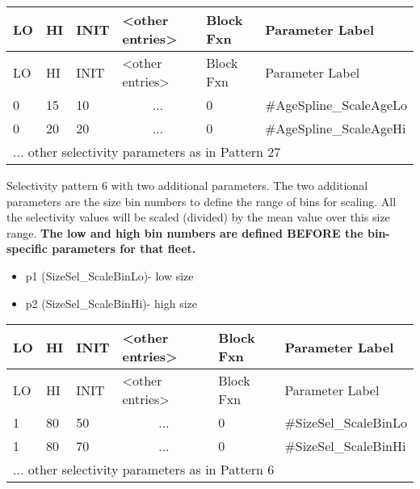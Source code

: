 	\begin{longtable}{p{1cm} p{1cm} p{1cm} p{2.9cm} p{1.9cm} p{4.2cm}}
		\hline
		LO \Tstrut & HI & INIT & <other entries> & Block Fxn & Parameter Label \Bstrut\\
		\hline
		\endfirsthead
	
		\hline
		LO \Tstrut & HI & INIT & <other entries> & Block Fxn & Parameter Label \Bstrut\\
		\hline
		\endhead

		0 & 15 & 10 & \multicolumn{1}{c}{...} & 0 & \#AgeSpline\_ScaleAgeLo \Tstrut\\
		0 & 20 & 20 & \multicolumn{1}{c}{...} & 0 & \#AgeSpline\_ScaleAgeHi \Tstrut\\
		\multicolumn{6}{l}{... other selectivity parameters as in Pattern 27} \Bstrut\\
		\hline
	\end{longtable}

\hypertarget{NonParamScaling}{}
Selectivity pattern 6 with two additional parameters. The two additional parameters are the size bin numbers to define the range of bins for scaling. All the selectivity values will be scaled (divided) by the mean value over this size range. \textbf{The low and high bin numbers are defined BEFORE the bin-specific parameters for that fleet.}
	\begin{itemize}
		\item p1 (SizeSel\_ScaleBinLo)- low size
		\item p2 (SizeSel\_ScaleBinHi)- high size
	\end{itemize}

	\begin{longtable}{p{1cm} p{1cm} p{1cm} p{2.9cm} p{1.9cm} p{4.2cm}}
		\hline
		LO \Tstrut & HI & INIT & <other entries> & Block Fxn & Parameter Label \Bstrut\\
		\hline
		\endfirsthead
	
		\hline
		LO \Tstrut & HI & INIT & <other entries> & Block Fxn & Parameter Label \Bstrut\\
		\hline
		\endhead

		1 & 80 & 50 & \multicolumn{1}{c}{...} & 0 & \#SizeSel\_ScaleBinLo \Tstrut\\
		1 & 80 & 70 & \multicolumn{1}{c}{...} & 0 & \#SizeSel\_ScaleBinHi \Tstrut\\
		\multicolumn{6}{l}{... other selectivity parameters as in Pattern 6} \Bstrut\\
		\hline
	\end{longtable}


